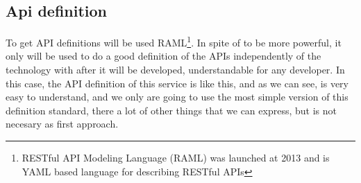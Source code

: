 \subsection{Api definition}

To get API definitions will be used  RAML\footnote{ RESTful API Modeling Language
(RAML) was launched at 2013 and is YAML based language for describing RESTful APIs }.
In spite of to be more powerful, it only will be used to do a good definition of the
APIs independently of the technology with after it will be developed, understandable
for any developer.
\intro
In this case, the API definition of this service is like this, and as we can see,
is very easy to understand, and we only are going to use the most simple
version of this definition standard, there a lot of other things that we can
express, but is not necesary as first approach.


